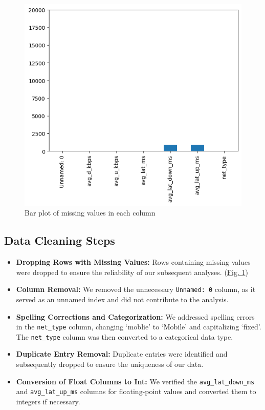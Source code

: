 \documentclass[
  letterpaper,
  DIV=11,
  numbers=noendperiod,
  oneside]{scrartcl}
\providecommand{\tightlist}{%
  \setlength{\itemsep}{0pt}\setlength{\parskip}{0pt}}\usepackage{longtable,booktabs,array}
\begin{document}
\begin{figure}[H]

{\centering \includegraphics{data-analytics_files/figure-latex/fig-missing-output-1.png}

}

\caption{\label{fig-missing}Bar plot of missing values in each column}

\end{figure}

\hypertarget{data-cleaning-steps}{%
\subsection{Data Cleaning Steps}\label{data-cleaning-steps}}

\begin{itemize}
\tightlist
\item
  \textbf{Dropping Rows with Missing Values:} Rows containing missing
  values were dropped to ensure the reliability of our subsequent
  analyses. (\protect\hyperlink{fig-missing}{Fig. 1})
\item
  \textbf{Column Removal:} We removed the unnecessary
  \texttt{Unnamed:\ 0} column, as it served as an unnamed index and did
  not contribute to the analysis.
\item
  \textbf{Spelling Corrections and Categorization:} We addressed
  spelling errors in the \texttt{net\_type} column, changing `moblie' to
  `Mobile' and capitalizing `fixed'. The \texttt{net\_type} column was
  then converted to a categorical data type.
\item
  \textbf{Duplicate Entry Removal:} Duplicate entries were identified
  and subsequently dropped to ensure the uniqueness of our data.
\item
  \textbf{Conversion of Float Columns to Int:} We verified the
  \texttt{avg\_lat\_down\_ms} and \texttt{avg\_lat\_up\_ms} columns for
  floating-point values and converted them to integers if necessary.
\end{itemize}
\end{document}
